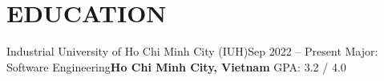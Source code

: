 \section{EDUCATION}
\resumeSubHeadingListStart

  \resumeSubheading
    {Industrial University of Ho Chi Minh City (IUH)}{Sep 2022 -- Present}
    {Major: Software Engineering}{\textbf{Ho Chi Minh City, Vietnam}}
  \vspace{-8pt}\resumeSubSubheading
    {GPA: 3.2 / 4.0}{}
  \vspace{-8pt}
\resumeSubHeadingListEnd
